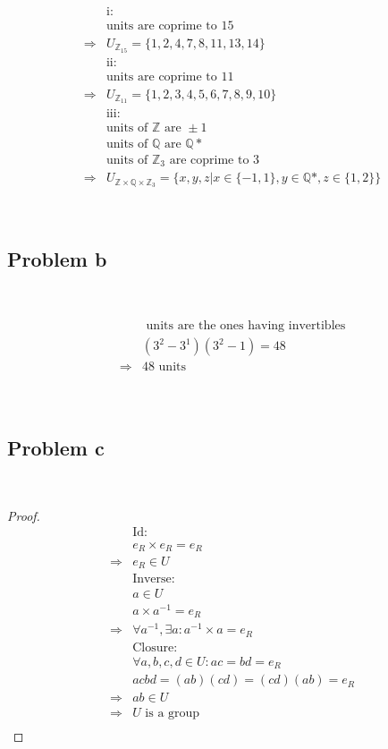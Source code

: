 \documentclass{article}
\begin{document}
~

\begin{align*}
    &\text{i}:\\
    &\text{units are coprime to }15\\
    \Rightarrow&U_{\mathbb{Z} _15}=\{1,2,4,7,8,11,13,14\}\\
    &\text{ii}:\\
    &\text{units are coprime to }11\\
    \Rightarrow&U_{\mathbb{Z} _11}=\{1,2,3,4,5,6,7,8,9,10\}\\
    &\text{iii}:\\
    &\text{units of }\mathbb{Z} \text{ are }\pm1\\
    &\text{units of }\mathbb{Q} \text{ are }\mathbb{Q} *\\
    &\text{units of }\mathbb{Z} _3\text{ are coprime to }3\\
    \Rightarrow&U_{\mathbb{Z}\times\mathbb{Q} \times\mathbb{Z} _3}=\{x,y,z|x\in\{-1,1\},y\in\mathbb{Q} *,z\in\{1,2\}\}
\end{align*}

~

\subsection*{Problem b}

~

\begin{align*}
    &\text{ units are the ones having invertibles}\\
    &(3^2-3^1)(3^2-1)=48\\
    \Rightarrow&48\text{ units}\\
\end{align*}

~

\subsection*{Problem c}

~

\begin{proof}
    \begin{align*}
        &\text{Id}:\\
        &e_R\times e_R=e_R\\
        \Rightarrow&e_R\in U\\
        &\text{Inverse}:\\
        &a\in U\\
        &a\times a^{-1}=e_R\\
        \Rightarrow&\forall a^{-1},\exists a:a^{-1}\times a=e_R\\
        &\text{Closure}:\\
        &\forall a,b,c,d\in U:ac=bd=e_R\\
        &acbd=(ab)(cd)=(cd)(ab)=e_R\\
        \Rightarrow&ab\in U\\
        \Rightarrow&U\text{ is a group}\\
    \end{align*}
\end{proof}
\end{document}
